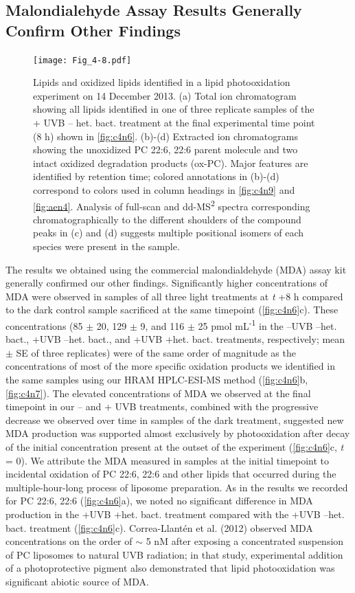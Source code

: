 \subsection{Malondialehyde Assay Results Generally Confirm Other Findings}
\begin{figure}[!t]
\centering
\texttt{[image: Fig\_4-8.pdf]}
\caption[Lipids and oxidized lipids identified in the lipid photooxidation experiment presented in \autoref{fig:c4n6}]{Lipids and oxidized lipids identified in a lipid photooxidation experiment on 14 December 2013. (a) Total ion chromatogram showing all lipids identified in one of three replicate samples of the + UVB -- het. bact. treatment at the final experimental time point (8 h) shown in \autoref{fig:c4n6}. (b)-(d) Extracted ion chromatograms showing the unoxidized PC 22:6, 22:6 parent molecule and two intact oxidized degradation products (ox-PC). Major features are identified by retention time; colored annotations in (b)-(d) correspond to colors used in column headings in \autoref{fig:c4n9} and \autoref{fig:aen4}. Analysis of full-scan and dd-MS\textsuperscript{2} spectra corresponding chromatographically to the different shoulders of the compound peaks in (c) and (d) suggests multiple positional isomers of each species were present in the sample.}
\label{fig:c4n8}
\end{figure}

The results we obtained using the commercial malondialdehyde (MDA) assay kit generally confirmed our other findings. Significantly higher concentrations of MDA were observed in samples of all three light treatments at \emph{t} +8 h compared to the dark control sample sacrificed at the same timepoint (\autoref{fig:c4n6}c). These concentrations (85 $\pm$ 20, 129 $\pm$ 9, and 116 $\pm$ 25 pmol mL\textsuperscript{-1} in the --UVB --het. bact., +UVB --het. bact., and +UVB +het. bact. treatments, respectively; mean $\pm$ SE of three replicates) were of the same order of magnitude as the concentrations of most of the more specific oxidation products we identified in the same samples using our HRAM HPLC-ESI-MS method (\autoref{fig:c4n6}b, \autoref{fig:c4n7}). The elevated concentrations of MDA we observed at the final timepoint in our -- and + UVB treatments, combined with the progressive decrease we observed over time in samples of the dark treatment, suggested new MDA production was supported almost exclusively by photooxidation after decay of the initial concentration present at the outset of the experiment (\autoref{fig:c4n6}c, \emph{t} = 0). We attribute the MDA measured in samples at the initial timepoint to incidental oxidation of PC 22:6, 22:6 and other lipids that occurred during the multiple-hour-long process of liposome preparation. As in the results we recorded for PC 22:6, 22:6 (\autoref{fig:c4n6}a), we noted no significant difference in MDA production in the +UVB +het. bact. treatment compared with the +UVB --het. bact. treatment (\autoref{fig:c4n6}c). Correa-Llant\'{e}n et al. (2012) observed MDA concentrations on the order of $\sim$ 5 nM after exposing a concentrated suspension of PC liposomes to natural UVB radiation; in that study, experimental addition of a photoprotective pigment also demonstrated that lipid photooxidation was significant abiotic source of MDA.

